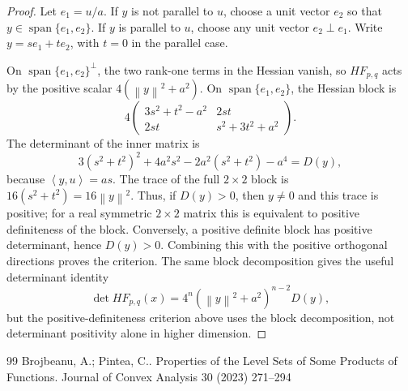 \documentclass[10pt,a4paper]{amsart}
\newcommand{\ip}[2]{\left\langle #1,#2\right\rangle}
\newcommand{\norm}[1]{\left\lVert #1\right\rVert}
\begin{document}
\begin{proof}
Let $e_1=u/a$. If $y$ is not parallel to $u$, choose a unit vector $e_2$
so that $y\in\operatorname{span}\{e_1,e_2\}$. If $y$ is parallel to $u$,
choose any unit vector $e_2\perp e_1$. Write $y=se_1+te_2$, with $t=0$
in the parallel case.

On $\operatorname{span}\{e_1,e_2\}^{\perp}$, the two rank-one terms in the
Hessian vanish, so $HF_{p,q}$ acts by the positive scalar
$4(\norm{y}^2+a^2)$. On $\operatorname{span}\{e_1,e_2\}$, the Hessian block is
\[
 4\begin{pmatrix}
 3s^2+t^2-a^2 & 2st\\
 2st & s^2+3t^2+a^2
 \end{pmatrix}.
\]
The determinant of the inner matrix is
\[
 3(s^2+t^2)^2+4a^2s^2-2a^2(s^2+t^2)-a^4
 =D(y),
\]
because $\ip{y}{u}=as$. The trace of the full $2\times2$ block is
$16(s^2+t^2)=16\norm{y}^2$. Thus, if $D(y)>0$, then $y\ne0$ and this trace is
positive; for a real symmetric $2\times2$ matrix this is equivalent to
positive definiteness of the block. Conversely, a positive definite block has
positive determinant, hence $D(y)>0$. Combining this with the positive
orthogonal directions proves the criterion. The same block decomposition gives
the useful determinant identity
\[
 \det HF_{p,q}(x)=4^n(\norm{y}^2+a^2)^{n-2}D(y),
\]
but the positive-definiteness criterion above uses the block decomposition, not
determinant positivity alone in higher dimension.
\end{proof}


\begin{thebibliography}{99}
 Brojbeanu, A.; Pintea, C.. Properties of the Level Sets of Some Products of Functions. Journal of Convex Analysis 30 (2023) 271--294
\end{thebibliography}
\end{document}
